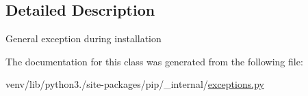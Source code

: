 \subsection{Detailed Description}
\begin{DoxyVerb}General exception during installation\end{DoxyVerb}
 

The documentation for this class was generated from the following file\+:\begin{DoxyCompactItemize}
\item 
venv/lib/python3./site-\/packages/pip/\+\_\+internal/\hyperlink{pip_2__internal_2exceptions_8py}{exceptions.\+py}\end{DoxyCompactItemize}
